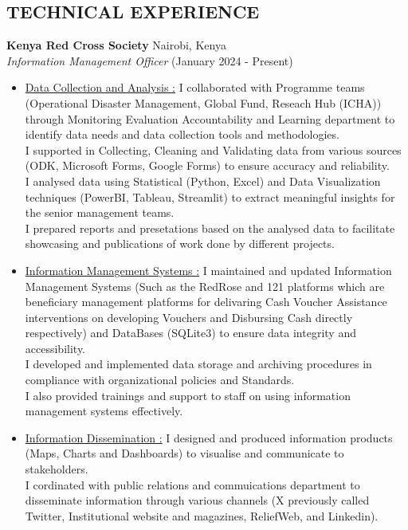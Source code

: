 \documentclass[line,margin,10pt]{res}
\begin{document}
\begin{resume}
\section{TECHNICAL EXPERIENCE}


\textbf{Kenya Red Cross Society} \hfill Nairobi, Kenya\\
{\sl Information Management Officer} \hfill (January 2024 - Present)
\begin{itemize} \itemsep -2pt
    \item \underline{Data Collection and Analysis :}
    I collaborated with Programme teams (Operational Disaster Management, Global Fund, Reseach Hub (ICHA)) through Monitoring Evaluation Accountability and Learning department to identify data needs and data collection tools and methodologies.\\
    I supported in Collecting, Cleaning and Validating data from various sources (ODK, Microsoft Forms, Google Forms) to ensure accuracy and reliability.\\
    I analysed data using Statistical (Python, Excel) and Data Visualization techniques (PowerBI, Tableau, Streamlit) to extract meaningful insights for the senior management teams.\\
    I prepared reports and presetations based on the analysed data to facilitate showcasing and publications of work done by different projects.
    \item \underline{Information Management Systems :}
    I maintained and updated Information Management Systems (Such as the RedRose and 121 platforms which are beneficiary management platforms for delivaring Cash Voucher Assistance interventions on developing Vouchers and Disbursing Cash directly respectively) and DataBases (SQLite3) to ensure data integrity and accessibility.\\
    I developed and implemented data storage and archiving procedures in compliance with organizational policies and Standards.\\
    I also provided trainings and support to staff on using information management systems effectively.
    \item \underline{Information Dissemination :}
    I designed and produced information products (Maps, Charts and Dashboards) to visualise and communicate to stakeholders.\\
    I cordinated with public relations and commuications department to disseminate information through various channels (X previously called Twitter, Institutional website and magazines, ReliefWeb, and Linkedin).

\end{itemize}
\end{resume}
\end{document}
